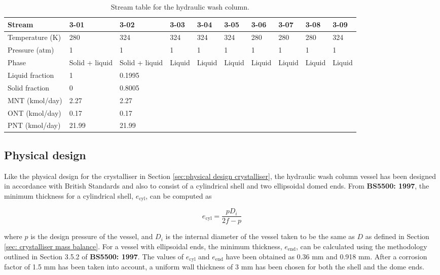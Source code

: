 \begin{table}[h]
\centering
\caption{Stream table for the hydraulic wash column.}
\label{tab:wash column stream table}
\begin{tabular}{@{}l|l|l|l|l|l|l|l|l|l@{}}
\toprule
Stream            & 3-01 & 3-02 & 3-03 & 3-04 & 3-05 & 3-06 & 3-07 & 3-08 & 3-09 \\ \midrule
Temperature (K)   & 280 & 324 & 324 & 324 & 324 & 280 & 280 & 280 & 324 \\ \midrule
Pressure (atm)    & 1   & 1   & 1   & 1   & 1   & 1   & 1   & 1   & 1 \\ \midrule
Phase & Solid + liquid & Solid + liquid & Liquid & Liquid & Liquid & Liquid & Liquid & Liquid & Liquid \\ \midrule
Liquid fraction &  1 & 0.1995 \\ \midrule
Solid fraction  &  0 & 0.8005 \\ \midrule
MNT (kmol/day)  &  2.27  & 2.27 \\ \midrule
ONT (kmol/day)  &  0.17 & 0.17 \\ \midrule
PNT (kmol/day)  &  21.99 & 21.99 \\ \bottomrule
\end{tabular}
\end{table}

\subsection{Physical design}
Like the physical design for the crystalliser in Section \ref{sec:physical design crystalliser}, the hydraulic wash column vessel has been designed in accordance with British Standards and also to consist of a cylindrical shell and two ellipsoidal domed ends. From \textbf{BS5500: 1997}, the minimum thickness for a cylindrical shell, $e_{\mathrm{cyl}}$, can be computed as 

\begin{equation}
    e_{\mathrm{cyl}} = \frac{p D_i}{2f - p}
\end{equation}

\noindent where $p$ is the design pressure of the vessel, and $D_i$ is the internal diameter of the vessel taken to be the same as $D$ as defined in Section \ref{sec: crystalliser mass balance}. For a vessel with ellipsoidal ends, the minimum thickness, $e_{\mathrm{end}}$, can be calculated using the methodology outlined in Section 3.5.2 of \textbf{BS5500: 1997}. The values of $e_{\mathrm{cyl}}$ and $e_{\mathrm{end}}$ have been obtained as 0.36 mm and 0.918 mm. After a corrosion factor of 1.5 mm has been taken into account, a uniform wall thickness of 3 mm has been chosen for both the shell and the dome ends. 

